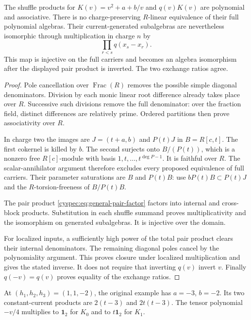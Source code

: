 \begin{theorem}\label{cyspec:thm:general-even-factor}
The shuffle products for $K(v)=v^2+a+b/v$ and $q(v)K(v)$ are
polynomial and associative. There is no charge-preserving
$R$-linear equivalence of their full polynomial algebras.
Their current-generated subalgebras are nevertheless isomorphic
through multiplication in charge $n$ by
\begin{equation}\label{cyspec:eq:general-pair-factor}
 \prod_{r<s}q(x_s-x_r).
\end{equation}
This map is injective on the full carriers and becomes an algebra
isomorphism after the displayed pair product is inverted.
The two exchange ratios agree.
\end{theorem}

\begin{proof}
Pole cancellation over $\operatorname{Frac}(R)$ removes the possible
simple diagonal denominators. Division by each monic linear root
difference already takes place over $R$. Successive such divisions
remove the full denominator: over the fraction field, distinct
differences are relatively prime. Ordered partitions then prove
associativity over $R$.

In charge two the images are $J=(t+a,b)$ and $P(t)J$ in $B=R[c,t]$.
The first cokernel is killed by $b$. The second surjects onto
$B/(P(t))$, which is a nonzero free $R[c]$-module with basis
$1,t,\ldots,t^{\deg P-1}$. It is faithful over $R$.
The scalar-annihilator argument therefore excludes every proposed
equivalence of full carriers. Their parameter saturations are
$B$ and $P(t)B$: use $bP(t)B\subset P(t)J$ and the
$R$-torsion-freeness of $B/P(t)B$.

The pair product \eqref{cyspec:eq:general-pair-factor} factors into
internal and cross-block products. Substitution in each shuffle
summand proves multiplicativity and the isomorphism on generated
subalgebras. It is injective over the domain.

For localized inputs, a sufficiently high power of the total pair
product clears their internal denominators. The remaining diagonal
poles cancel by the polynomiality argument. This proves closure
under localized multiplication and gives the stated inverse.
It does not require that inverting $q(v)$ invert $v$.
Finally $q(-v)=q(v)$ proves equality of the exchange ratios.
\end{proof}

At $(h_1,h_2,h_3)=(1,1,-2)$, the original example has $a=-3$, $b=-2$.
Its two constant-current products are $2(t-3)$ and $2t(t-3)$.
The tensor polynomial $-v/4$ multiplies to $\mathbf1_2$ for $K_0$
and to $t\mathbf1_2$ for $K_1$.

